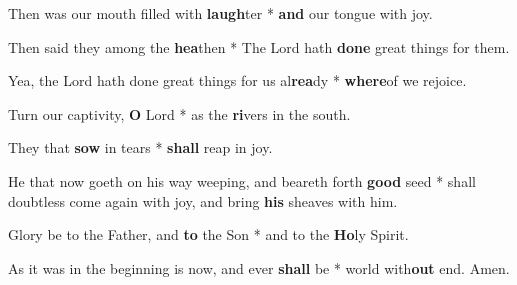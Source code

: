 \begin{multicols}{2}
	Then was our mouth filled with \textbf{laugh}ter * \textbf{and} our tongue with joy.
	
	Then said they among the \textbf{hea}then * The Lord hath \textbf{done} great things for them.
	
	Yea, the Lord hath done great things for us al\textbf{rea}dy * \textbf{where}of we rejoice.
	
	Turn our captivity, \textbf{O} Lord * as the \textbf{ri}vers in the south.
	
	They that \textbf{sow} in tears * \textbf{shall} reap in joy.
	
	He that now goeth on his way weeping, and beareth forth \textbf{good} seed * shall doubtless come again with joy, and bring \textbf{his} sheaves with him.
	
	Glory be to the Father, and \textbf{to} the Son * and to the \textbf{Ho}ly Spirit.
	
	As it was in the beginning is now, and ever \textbf{shall} be * world with\textbf{out} end. Amen.
\end{multicols}